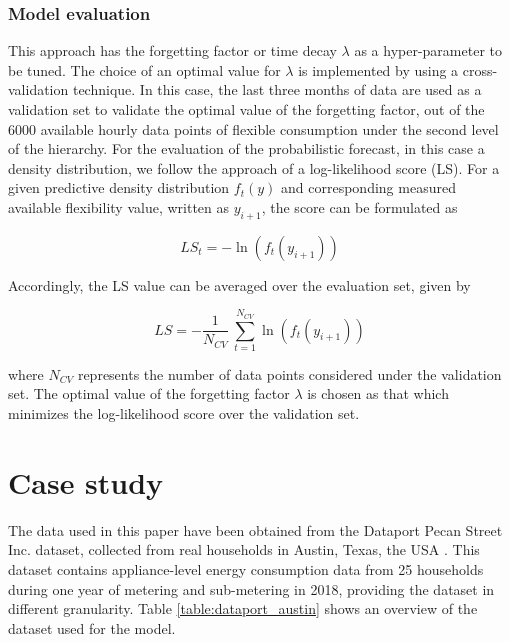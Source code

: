 \subsubsection{Model evaluation}
This approach has the forgetting factor or time decay $\lambda$ as a hyper-parameter to be tuned. The choice of an optimal value for $\lambda$ is implemented by using a cross-validation technique. In this case, the last three months of data are used as a validation set to validate the optimal value of the forgetting factor, out of the 6000 available hourly data points of flexible consumption under the second level of the hierarchy. For the evaluation of the probabilistic forecast, in this case a density distribution, we follow the approach of a log-likelihood score (LS). For a given predictive density distribution $f_{t}(y)$ and corresponding measured available flexibility value, written as $y_{i+1}$, the score can be formulated as

\begin{equation}
    LS_{t} = - \ln \left(f_{t}(y_{i+1})\right)
\end{equation}

Accordingly, the LS value can be averaged over the evaluation set, given by 

\begin{equation}
    LS = - \frac{1}{N_{CV}} \ \sum_{t=1}^{N_{CV}} \ln \left(f_{t}(y_{i+1})\right)
\end{equation}

where $N_{CV}$ represents the number of data points considered under the validation set.
The optimal value of the forgetting factor $\lambda$ is chosen as that which minimizes the log-likelihood score  over the validation set. 

\section{Case study} \label{Sect:CaseStudy}
The data used in this paper have been obtained from the Dataport Pecan Street Inc. dataset, collected from real households in Austin, Texas, the USA \cite{PecanStreetInc}. This dataset contains appliance-level energy consumption data from 25 households during one year of metering and sub-metering in 2018, providing the dataset in different granularity. Table \ref{table:dataport_austin} shows an overview of the dataset used for the model.


